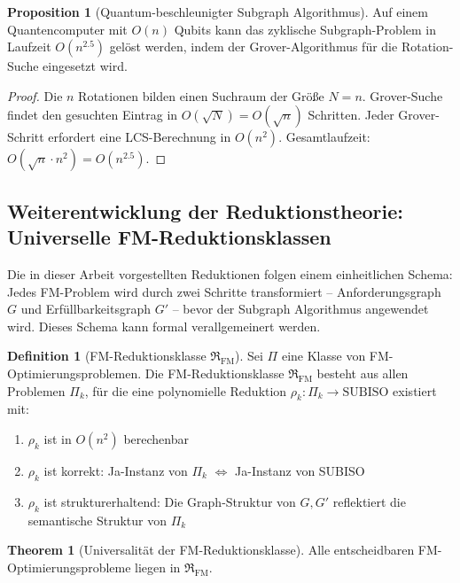 ﻿\documentclass[a4paper,12pt]{article}
\theoremstyle{definition}
\newtheorem{definition}{Definition}[section]
\newtheorem{theorem}{Theorem}[section]
\newtheorem{proposition}{Proposition}[section]
\begin{document}
\begin{proposition}[Quantum-beschleunigter Subgraph Algorithmus]
\label{prop:quantum}
Auf einem Quantencomputer mit $O(n)$ Qubits kann das zyklische Subgraph-Problem
in Laufzeit $O(n^{2.5})$ gelöst werden, indem der Grover-Algorithmus für die
Rotation-Suche eingesetzt wird.
\end{proposition}

\begin{proof}
Die $n$ Rotationen bilden einen Suchraum der Größe $N = n$.
Grover-Suche findet den gesuchten Eintrag in $O(\sqrt{N}) = O(\sqrt{n})$ Schritten.
Jeder Grover-Schritt erfordert eine LCS-Berechnung in $O(n^2)$.
Gesamtlaufzeit: $O(\sqrt{n} \cdot n^2) = O(n^{2.5})$.
\end{proof}

\subsection{Weiterentwicklung der Reduktionstheorie: Universelle FM-Reduktionsklassen}

Die in dieser Arbeit vorgestellten Reduktionen folgen einem einheitlichen Schema:
Jedes FM-Problem wird durch zwei Schritte transformiert -- Anforderungsgraph $G$
und Erfüllbarkeitsgraph $G'$ -- bevor der Subgraph Algorithmus angewendet wird.
Dieses Schema kann formal verallgemeinert werden.

\begin{definition}[FM-Reduktionsklasse $\mathfrak{R}_{\mathrm{FM}}$]
\label{def:redklasse}
Sei $\Pi$ eine Klasse von FM-Optimierungspro\-blemen.
Die FM-Reduktionsklasse $\mathfrak{R}_{\mathrm{FM}}$ besteht aus allen Problemen
$\Pi_k$, für die eine polynomielle Reduktion
$\rho_k: \Pi_k \to \mathrm{SUBISO}$ existiert mit:
\begin{enumerate}
    \item $\rho_k$ ist in $O(n^2)$ berechenbar
    \item $\rho_k$ ist korrekt: Ja-Instanz von $\Pi_k$ $\Leftrightarrow$ Ja-Instanz von SUBISO
    \item $\rho_k$ ist strukturerhaltend: Die Graph-Struktur von $G, G'$
          reflektiert die semantische Struktur von $\Pi_k$
\end{enumerate}
\end{definition}

\begin{theorem}[Universalität der FM-Reduktionsklasse]
\label{thm:universal}
Alle entscheidbaren FM-Opti\-mierungsprobleme liegen in $\mathfrak{R}_{\mathrm{FM}}$.
\end{theorem}
\end{document}
